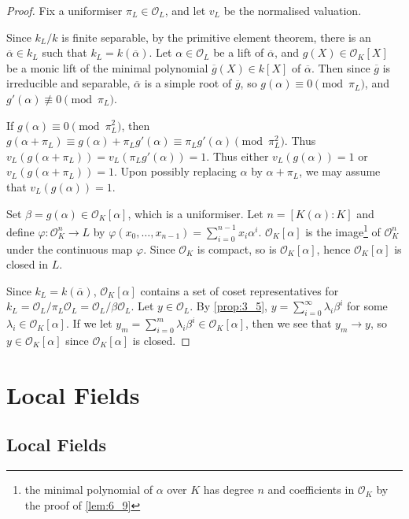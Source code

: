 \documentclass[11pt]{article}
\theoremstyle{definition}
\theoremstyle{plain}
\theoremstyle{remark}
\newcommand{\cO}{\mathcal{O}}
\begin{document}
\begin{proof}
    Fix a uniformiser $\pi_L \in \cO_L$, and let $v_L$ be the normalised valuation.

    Since $k_L/k$ is finite separable, by the primitive element theorem, there is an $\overline{\alpha} \in k_L$ such that $k_L = k(\overline{\alpha})$. Let $\alpha \in \cO_L$ be a lift of $\overline{\alpha}$, and $g(X) \in \cO_K[X]$ be a monic lift of the minimal polynomial $\overline{g}(X) \in k[X]$ of $\overline{\alpha}$. Then since $\overline{g}$ is irreducible and separable, $\overline{\alpha}$ is a simple root of $\overline{g}$, so $g(\alpha) \equiv 0 \pmod{\pi_L}$, and $g'(\alpha) \not\equiv 0 \pmod{\pi_L}$.

    If $g(\alpha) \equiv 0 \pmod{\pi_L^2}$, then $g(\alpha + \pi_L) \equiv g(\alpha) + \pi_L g'(\alpha) \equiv \pi_L g'(\alpha) \pmod{\pi_L^2}$. Thus $v_L(g(\alpha + \pi_L)) = v_L(\pi_L g'(\alpha)) = 1$. Thus either $v_L(g(\alpha)) = 1$ or $v_L(g(\alpha + \pi_L)) = 1$. Upon possibly replacing $\alpha$ by $\alpha + \pi_L$, we may assume that $v_L(g(\alpha)) = 1$.

    Set $\beta = g(\alpha) \in \cO_K[\alpha]$, which is a uniformiser. Let $n = [K(\alpha) : K]$ and define $\varphi : \cO_K^n \to L$ by $\varphi(x_0, \ldots, x_{n-1}) = \sum_{i=0}^{n-1} x_i \alpha^i$. $\cO_K[\alpha]$ is the image\footnote{the minimal polynomial of $\alpha$ over $K$ has degree $n$ and coefficients in $\cO_K$ by the proof of \autoref{lem:6_9}} of $\cO_K^n$ under the continuous map $\varphi$. Since $\cO_K$ is compact, so is $\cO_K[\alpha]$, hence $\cO_K[\alpha]$ is closed in $L$.

    Since $k_L = k(\overline{\alpha})$, $\cO_K[\alpha]$ contains a set of coset representatives for $k_L = \cO_L / \pi_L \cO_L = \cO_L / \beta \cO_L$. Let $y \in \cO_L$. By \autoref{prop:3_5}, $y = \sum_{i=0}^\infty \lambda_i \beta^i$ for some $\lambda_i \in \cO_K[\alpha]$. If we let $y_m = \sum_{i=0}^m \lambda_i \beta^i \in \cO_K[\alpha]$, then we see that $y_m \to y$, so $y \in \cO_K[\alpha]$ since $\cO_K[\alpha]$ is closed.
\end{proof}

\section{Local Fields}

\subsection{Local Fields}
\end{document}
